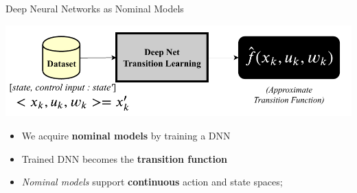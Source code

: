 \documentclass[usenames,dvipsnames]{beamer}
\begin{document}
	
	
    \begin{frame}[c]{Deep Neural Networks as Nominal Models}
		\begin{center}
			\includegraphics[width=0.95\linewidth]{fig/DNNs_as_NominalModels.pdf}
		\end{center}
%
		
			\begin{itemize}
				\item We acquire \textbf{nominal models} by training a DNN
				\item Trained DNN becomes the \textbf{transition function}
				\item \textit{Nominal models} support \textbf{continuous} action and state spaces;
			\end{itemize}		
    \end{frame}
	
\end{document}
